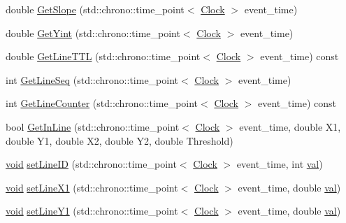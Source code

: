 \begin{DoxyCompactItemize}
\item 
double \mbox{\hyperlink{class_line_a2be3926d47a1a8849007a6c29a603dcf}{Get\+Slope}} (std\+::chrono\+::time\+\_\+point$<$ \mbox{\hyperlink{universe_8h_a0ef8d951d1ca5ab3cfaf7ab4c7a6fd80}{Clock}} $>$ event\+\_\+time)
\item 
double \mbox{\hyperlink{class_line_a5319d68ecb254ff61e2a46d5928aec93}{Get\+Yint}} (std\+::chrono\+::time\+\_\+point$<$ \mbox{\hyperlink{universe_8h_a0ef8d951d1ca5ab3cfaf7ab4c7a6fd80}{Clock}} $>$ event\+\_\+time)
\item 
double \mbox{\hyperlink{class_line_a5b9419146093908e5c7d740ac384fe39}{Get\+Line\+T\+TL}} (std\+::chrono\+::time\+\_\+point$<$ \mbox{\hyperlink{universe_8h_a0ef8d951d1ca5ab3cfaf7ab4c7a6fd80}{Clock}} $>$ event\+\_\+time) const
\item 
int \mbox{\hyperlink{class_line_a8764cb987ec4af839f30411dc47a835a}{Get\+Line\+Seq}} (std\+::chrono\+::time\+\_\+point$<$ \mbox{\hyperlink{universe_8h_a0ef8d951d1ca5ab3cfaf7ab4c7a6fd80}{Clock}} $>$ event\+\_\+time)
\item 
int \mbox{\hyperlink{class_line_ac13c6405cfd2a586633b5a5eece05fff}{Get\+Line\+Counter}} (std\+::chrono\+::time\+\_\+point$<$ \mbox{\hyperlink{universe_8h_a0ef8d951d1ca5ab3cfaf7ab4c7a6fd80}{Clock}} $>$ event\+\_\+time) const
\item 
bool \mbox{\hyperlink{class_line_a4c9d571599ebc5e9b6090b54a338fbde}{Get\+In\+Line}} (std\+::chrono\+::time\+\_\+point$<$ \mbox{\hyperlink{universe_8h_a0ef8d951d1ca5ab3cfaf7ab4c7a6fd80}{Clock}} $>$ event\+\_\+time, double X1, double Y1, double X2, double Y2, double Threshold)
\item 
\mbox{\hyperlink{glad_8h_a950fc91edb4504f62f1c577bf4727c29}{void}} \mbox{\hyperlink{class_line_aaa634bf320b9d1c4becb4083cd8324d4}{set\+Line\+ID}} (std\+::chrono\+::time\+\_\+point$<$ \mbox{\hyperlink{universe_8h_a0ef8d951d1ca5ab3cfaf7ab4c7a6fd80}{Clock}} $>$ event\+\_\+time, int \mbox{\hyperlink{glad_8h_a26942fd2ed566ef553eae82d2c109c8f}{val}})
\item 
\mbox{\hyperlink{glad_8h_a950fc91edb4504f62f1c577bf4727c29}{void}} \mbox{\hyperlink{class_line_ab8df9f66bffc86994db3150a4eb8ed29}{set\+Line\+X1}} (std\+::chrono\+::time\+\_\+point$<$ \mbox{\hyperlink{universe_8h_a0ef8d951d1ca5ab3cfaf7ab4c7a6fd80}{Clock}} $>$ event\+\_\+time, double \mbox{\hyperlink{glad_8h_a26942fd2ed566ef553eae82d2c109c8f}{val}})
\item 
\mbox{\hyperlink{glad_8h_a950fc91edb4504f62f1c577bf4727c29}{void}} \mbox{\hyperlink{class_line_af236c5ddb0d125b388621b3597266a95}{set\+Line\+Y1}} (std\+::chrono\+::time\+\_\+point$<$ \mbox{\hyperlink{universe_8h_a0ef8d951d1ca5ab3cfaf7ab4c7a6fd80}{Clock}} $>$ event\+\_\+time, double \mbox{\hyperlink{glad_8h_a26942fd2ed566ef553eae82d2c109c8f}{val}})

\end{DoxyCompactItemize}
